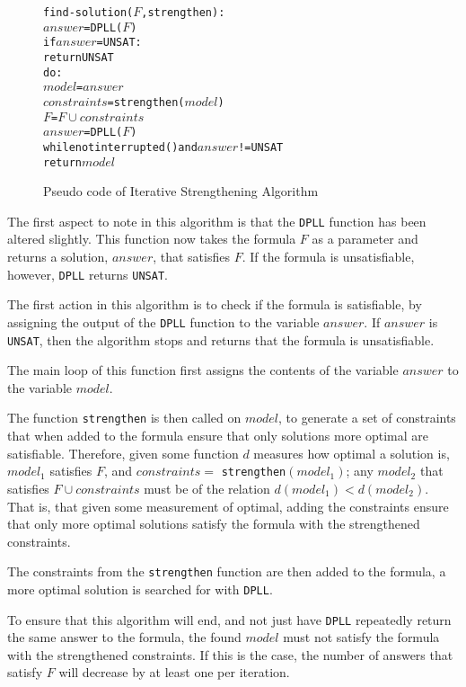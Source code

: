 \begin{figure}[htp]
\begin{center}
\begin{alltt}
find-solution(\(F\),strengthen):
    \(answer\) = DPLL(\(F\))
    if \(answer\) = UNSAT:
        return UNSAT
    do:
        \(model\) = \(answer\)
        \(constraints\) = strengthen(\(model\))
        \(F\) = \(F \cup constraints\)
        \(answer\) = DPLL(\(F\))
    while not interrupted() and \(answer\) != UNSAT
    return \(model\) 
\end{alltt}
  \caption{Pseudo code of Iterative Strengthening Algorithm}
  \label{impl.strength}
\end{center}
\end{figure}

The first aspect to note in this algorithm is that the \verb+DPLL+ function has been altered slightly.
This function now takes the formula $F$ as a parameter and returns a solution, $answer$, that satisfies $F$. 
If the formula is unsatisfiable, however, \verb+DPLL+ returns \verb+UNSAT+.

The first action in this algorithm is to check if the formula is satisfiable, by assigning the output of the \verb+DPLL+ function to the variable $answer$.
If $answer$ is \verb+UNSAT+, then the algorithm stops and returns that the formula is unsatisfiable.

The main loop of this function first assigns the contents of the variable $answer$ to the variable $model$.

The function \verb+strengthen+ is then called on $model$, to generate a set of constraints that when added to the formula ensure that only solutions more optimal are satisfiable.
Therefore, given some function $d$ measures how optimal a solution is, $model_1$ satisfies $F$, and $constraints = $ \verb+strengthen+$(model_1)$;
any $model_2$ that satisfies $F \cup constraints$ must be of the relation $d(model_1) < d(model_2)$.
That is, that given some measurement of optimal, adding the constraints ensure that only more optimal solutions satisfy the formula with the strengthened constraints. 

The constraints from the \verb+strengthen+ function are then added to the formula, a more optimal solution is searched for with \verb+DPLL+.

To ensure that this algorithm will end, and not just have \verb+DPLL+ repeatedly return the same answer to the formula, 
the found $model$ must not satisfy the formula with the strengthened constraints.
If this is the case, the number of answers that satisfy $F$ will decrease by at least one per iteration.

